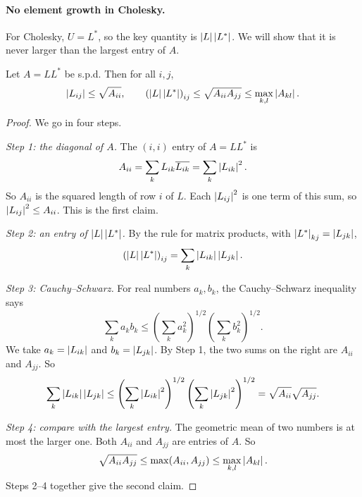 \paragraph{No element growth in Cholesky.} For Cholesky, $U = L^\ast$, so the key quantity is $\left\lvert L \right\rvert\left\lvert L^\ast \right\rvert$. We will show that it is never larger than the largest entry of $A$.

\begin{proposition}
  \label{prop:chol-growth}
  Let $A = LL^\ast$ be s.p.d. Then for all $i, j$,
  \begin{equation}
    \left\lvert L_{ij} \right\rvert \le \sqrt{A_{ii}}, \qquad \left(\left\lvert L \right\rvert\left\lvert L^\ast \right\rvert\right)_{ij} \le \sqrt{A_{ii}A_{jj}} \le \max_{k,l}\left\lvert A_{kl} \right\rvert.
  \end{equation}
\end{proposition}

\begin{proof}
  We go in four steps.

  \emph{Step 1: the diagonal of $A$.} The $(i, i)$ entry of $A = LL^\ast$ is
  \begin{equation*}
    A_{ii} = \sum_k L_{ik}\overline{L_{ik}} = \sum_k\left\lvert L_{ik} \right\rvert^2.
  \end{equation*}
  So $A_{ii}$ is the squared length of row $i$ of $L$. Each $\left\lvert L_{ij} \right\rvert^2$ is one term of this sum, so $\left\lvert L_{ij} \right\rvert^2 \le A_{ii}$. This is the first claim.

  \emph{Step 2: an entry of $\left\lvert L \right\rvert\left\lvert L^\ast \right\rvert$.} By the rule for matrix products, with $\left\lvert L^\ast \right\rvert_{kj} = \left\lvert L_{jk} \right\rvert$,
  \begin{equation*}
    \left(\left\lvert L \right\rvert\left\lvert L^\ast \right\rvert\right)_{ij} = \sum_k\left\lvert L_{ik} \right\rvert\left\lvert L_{jk} \right\rvert.
  \end{equation*}

  \emph{Step 3: Cauchy--Schwarz.} For real numbers $a_k, b_k$, the Cauchy--Schwarz inequality says
  \begin{equation*}
    \sum_k a_kb_k \le \left(\sum_k a_k^2\right)^{1/2}\left(\sum_k b_k^2\right)^{1/2}.
  \end{equation*}
  We take $a_k = \left\lvert L_{ik} \right\rvert$ and $b_k = \left\lvert L_{jk} \right\rvert$. By Step 1, the two sums on the right are $A_{ii}$ and $A_{jj}$. So
  \begin{equation*}
    \sum_k\left\lvert L_{ik} \right\rvert\left\lvert L_{jk} \right\rvert
    \le \left(\sum_k\left\lvert L_{ik} \right\rvert^2\right)^{1/2}\left(\sum_k\left\lvert L_{jk} \right\rvert^2\right)^{1/2}
    = \sqrt{A_{ii}}\sqrt{A_{jj}}.
  \end{equation*}

  \emph{Step 4: compare with the largest entry.} The geometric mean of two numbers is at most the larger one. Both $A_{ii}$ and $A_{jj}$ are entries of $A$. So
  \begin{equation*}
    \sqrt{A_{ii}A_{jj}} \le \max(A_{ii}, A_{jj}) \le \max_{k,l}\left\lvert A_{kl} \right\rvert.
  \end{equation*}
  Steps 2--4 together give the second claim.
\end{proof}

